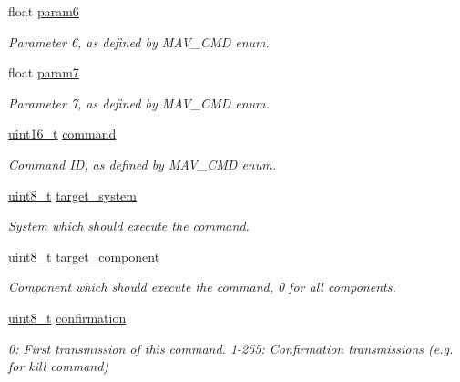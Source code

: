 \begin{DoxyCompactItemize}
float \hyperlink{struct____mavlink__command__long__t_ad75daa212f56fd47cd0956f8dc4fdbd5}{param6}
\begin{DoxyCompactList}\small\item\em Parameter 6, as defined by M\-A\-V\-\_\-\-C\-M\-D enum. \end{DoxyCompactList}\item 
float \hyperlink{struct____mavlink__command__long__t_a1bf675e543b14770e7c410adb9d3d21e}{param7}
\begin{DoxyCompactList}\small\item\em Parameter 7, as defined by M\-A\-V\-\_\-\-C\-M\-D enum. \end{DoxyCompactList}\item 
\hyperlink{stdint_8h_a273cf69d639a59973b6019625df33e30}{uint16\-\_\-t} \hyperlink{struct____mavlink__command__long__t_a059e44ecfa8fbb9f11543a81145265cf}{command}
\begin{DoxyCompactList}\small\item\em Command I\-D, as defined by M\-A\-V\-\_\-\-C\-M\-D enum. \end{DoxyCompactList}\item 
\hyperlink{stdint_8h_aba7bc1797add20fe3efdf37ced1182c5}{uint8\-\_\-t} \hyperlink{struct____mavlink__command__long__t_a705313e3359248c2e2b77d71b99a5d3d}{target\-\_\-system}
\begin{DoxyCompactList}\small\item\em System which should execute the command. \end{DoxyCompactList}\item 
\hyperlink{stdint_8h_aba7bc1797add20fe3efdf37ced1182c5}{uint8\-\_\-t} \hyperlink{struct____mavlink__command__long__t_ab2e28f55169c5076999e2c941bafce39}{target\-\_\-component}
\begin{DoxyCompactList}\small\item\em Component which should execute the command, 0 for all components. \end{DoxyCompactList}\item 
\hyperlink{stdint_8h_aba7bc1797add20fe3efdf37ced1182c5}{uint8\-\_\-t} \hyperlink{struct____mavlink__command__long__t_a79ec42e9308bf4cc44c64ae939fe1d61}{confirmation}
\begin{DoxyCompactList}\small\item\em 0\-: First transmission of this command. 1-\/255\-: Confirmation transmissions (e.\-g. for kill command) \end{DoxyCompactList}\end{DoxyCompactItemize}


